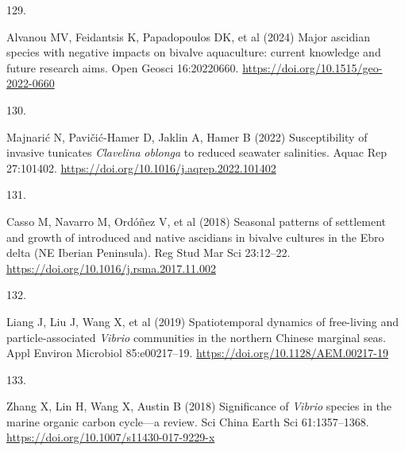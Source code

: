 \documentclass[
  12 pt,
]{article}
\newlength{\cslhangindent}
\newlength{\csllabelwidth}
\newenvironment{CSLReferences}[2] %
 {\begin{list}{}{%
  \setlength{\itemindent}{0pt}
  \setlength{\leftmargin}{0pt}
  \setlength{\parsep}{0pt}
  \ifodd #1
   \setlength{\leftmargin}{\cslhangindent}
   \setlength{\itemindent}{-1\cslhangindent}
  \fi
  \setlength{\itemsep}{#2\baselineskip}}}
 {\end{list}}
\newcommand{\CSLLeftMargin}[1]{\parbox[t]{\csllabelwidth}{\strut#1\strut}}
\newcommand{\CSLRightInline}[1]{\parbox[t]{\linewidth - \csllabelwidth}{\strut#1\strut}}
\begin{document}
\begin{CSLReferences}{0}{0}
\CSLLeftMargin{129. }%
\CSLRightInline{Alvanou MV, Feidantsis K, Papadopoulos DK, et al (2024) Major ascidian species with negative impacts on bivalve aquaculture: current knowledge and future research aims. Open Geosci 16:20220660. \url{https://doi.org/10.1515/geo-2022-0660}}

\CSLLeftMargin{130. }%
\CSLRightInline{Majnarić N, Pavičić-Hamer D, Jaklin A, Hamer B (2022) Susceptibility of invasive tunicates {{\emph{Clavelina}}}{{\emph{ oblonga}}} to reduced seawater salinities. Aquac Rep 27:101402. \url{https://doi.org/10.1016/j.aqrep.2022.101402}}

\CSLLeftMargin{131. }%
\CSLRightInline{Casso M, Navarro M, Ordóñez V, et al (2018) Seasonal patterns of settlement and growth of introduced and native ascidians in bivalve cultures in the {Ebro} delta ({NE Iberian Peninsula}). Reg Stud Mar Sci 23:12--22. \url{https://doi.org/10.1016/j.rsma.2017.11.002}}

\CSLLeftMargin{132. }%
\CSLRightInline{Liang J, Liu J, Wang X, et al (2019) Spatiotemporal dynamics of free-living and particle-associated {\emph{Vibrio}} communities in the northern Chinese marginal seas. Appl Environ Microbiol 85:e00217--19. \url{https://doi.org/10.1128/AEM.00217-19}}

\CSLLeftMargin{133. }%
\CSLRightInline{Zhang X, Lin H, Wang X, Austin B (2018) Significance of {{\emph{Vibrio}}} species in the marine organic carbon cycle---a review. Sci China Earth Sci 61:1357--1368. \url{https://doi.org/10.1007/s11430-017-9229-x}}

\end{CSLReferences}

\newpage
\end{document}
